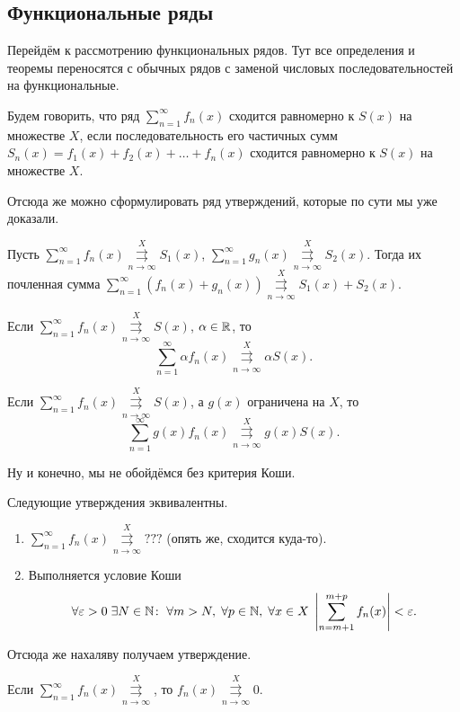 \documentclass[a4paper, 12pt]{article}
\begin{document}
	\subsection{Функциональные ряды}
	Перейдём к рассмотрению функциональных рядов. Тут все определения и теоремы переносятся с обычных рядов с заменой числовых последовательностей на функциональные.
	\begin{Def}
		Будем говорить, что ряд $\sum\limits_{n=1}^{\infty}f_n(x)$ сходится равномерно к $S(x)$ на множестве $X$, если последовательность его частичных сумм $S_n(x) = f_1(x) + f_2(x) + \ldots + f_n(x)$ сходится равномерно к $S(x)$ на множестве $X$. 
	\end{Def}
	Отсюда же можно сформулировать ряд утверждений, которые по сути мы уже доказали.
	\begin{Statement}
		Пусть $\sum\limits_{n=1}^\infty f_n(x) \overset{X}{\underset{n\to\infty}{\rightrightarrows}} S_1(x)$, 
		$\sum\limits_{n=1}^\infty g_n(x) \overset{X}{\underset{n\to\infty}{\rightrightarrows}} S_2(x)$. Тогда их почленная сумма $\sum\limits_{n=1}^\infty  (f_n(x) + g_n(x) ) \overset{X}{\underset{n\to\infty}{\rightrightarrows}} S_1(x) + S_2(x)$.
	\end{Statement}
	\begin{Statement}
		Если $\sum\limits_{n=1}^\infty f_n(x) \overset{X}{\underset{n\to\infty}{\rightrightarrows}} S(x)$, $\alpha \in \mathbb{R}$, то
		$$
			\sum\limits_{n=1}^\infty \alpha f_n(x) \overset{X}{\underset{n\to\infty}{\rightrightarrows}} \alpha S(x).
		$$
	\end{Statement}
	\begin{Statement}
		Если $\sum\limits_{n=1}^\infty f_n(x) \overset{X}{\underset{n\to\infty}{\rightrightarrows}} S(x)$, а $g(x)$ ограничена на $X$, то 
		$$
		\sum\limits_{n=1}^\infty g(x) f_n(x) \overset{X}{\underset{n\to\infty}{\rightrightarrows}} g(x)S(x).
		$$
	\end{Statement}
	Ну и конечно, мы не обойдёмся без критерия Коши.
	\begin{Statement}
		Следующие утверждения эквивалентны.
		\begin{enumerate}
			\item $\sum\limits_{n=1}^\infty f_n(x) \overset{X}{\underset{n\to\infty}{\rightrightarrows}} ???$ (опять же, сходится куда-то).
			\item Выполняется условие Коши 
			$$\forall \varepsilon >0\; \exists N \in \mathbb{N}\colon \; \forall m>N,\; \forall p \in \mathbb{N},\; \forall x\in X\; \left|\sum_{n=m+1}^{m+p} f_n(x)\right| < \varepsilon.
			$$
		\end{enumerate}
	\end{Statement}
	Отсюда же нахаляву получаем утверждение.
	\begin{Statement}
		Если $\sum\limits_{n=1}^\infty f_n(x)  \overset{X}{\underset{n\to\infty}{\rightrightarrows}}$, то $f_n(x) \overset{X}{\underset{n\to\infty}{\rightrightarrows}} 0$.
	\end{Statement}
\end{document}
